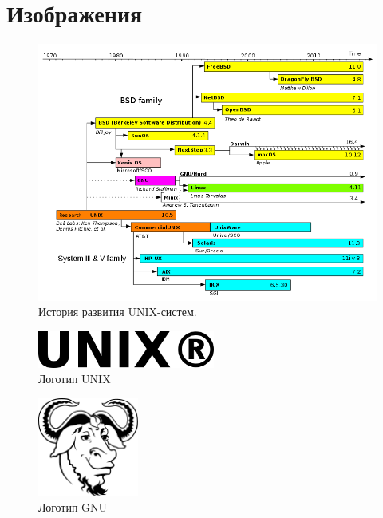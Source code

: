 \documentclass[bachelor, och, pract, times]{SCWorks}
\begin{document}


\tableofcontents












\appendix

\section{Изображения}

\begin{figure}[h]
    \centering
    \includegraphics[width=1\textwidth]{790px-Unix_timeline.png}
    \caption{История развития UNIX-систем.}
    \label{fig:hist}
\end{figure}

\begin{figure}[h]
    \centering
    \includegraphics[width=220px]{UNIX.png}
    \caption{Логотип UNIX}
    \label{fig:UNIX_symbol}
\end{figure}

\begin{figure}[h]
    \centering
    \includegraphics[width=125px]{128px-Heckert_GNU_white.png}
    \caption{Логотип GNU}
    \label{fig:GNU_symbol}
\end{figure}
\end{document}
